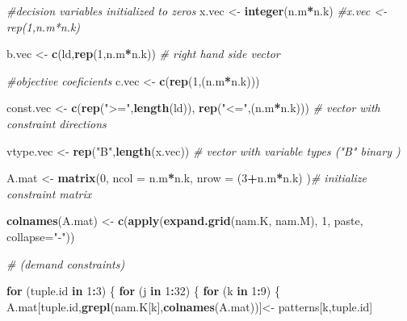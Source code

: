 \documentclass[
]{article}
\newenvironment{Shaded}{\begin{snugshade}}{\end{snugshade}}
\newcommand{\CommentTok}[1]{\textcolor[rgb]{0.56,0.35,0.01}{\textit{#1}}}
\newcommand{\ControlFlowTok}[1]{\textcolor[rgb]{0.13,0.29,0.53}{\textbf{#1}}}
\newcommand{\DataTypeTok}[1]{\textcolor[rgb]{0.13,0.29,0.53}{#1}}
\newcommand{\DecValTok}[1]{\textcolor[rgb]{0.00,0.00,0.81}{#1}}
\newcommand{\KeywordTok}[1]{\textcolor[rgb]{0.13,0.29,0.53}{\textbf{#1}}}
\newcommand{\NormalTok}[1]{#1}
\newcommand{\OperatorTok}[1]{\textcolor[rgb]{0.81,0.36,0.00}{\textbf{#1}}}
\newcommand{\StringTok}[1]{\textcolor[rgb]{0.31,0.60,0.02}{#1}}
\begin{document}
\begin{Shaded}
\begin{Highlighting}[]
\CommentTok{#decision variables initialized to zeros}
\NormalTok{x.vec <-}\StringTok{ }\KeywordTok{integer}\NormalTok{(n.m}\OperatorTok{*}\NormalTok{n.k)}
\CommentTok{#x.vec <- rep(1,n.m*n.k)}

\NormalTok{b.vec <-}\StringTok{ }\KeywordTok{c}\NormalTok{(ld,}\KeywordTok{rep}\NormalTok{(}\DecValTok{1}\NormalTok{,n.m}\OperatorTok{*}\NormalTok{n.k)) }\CommentTok{# right hand side vector }

\CommentTok{#objective coeficients}
\NormalTok{c.vec <-}\StringTok{ }\KeywordTok{c}\NormalTok{(}\KeywordTok{rep}\NormalTok{(}\DecValTok{1}\NormalTok{,(n.m}\OperatorTok{*}\NormalTok{n.k)))}
  
\NormalTok{const.vec <-}\StringTok{ }\KeywordTok{c}\NormalTok{(}\KeywordTok{rep}\NormalTok{(}\StringTok{">="}\NormalTok{,}\KeywordTok{length}\NormalTok{(ld)), }\KeywordTok{rep}\NormalTok{(}\StringTok{"<="}\NormalTok{,(n.m}\OperatorTok{*}\NormalTok{n.k))) }\CommentTok{# vector with constraint directions }

\NormalTok{vtype.vec <-}\StringTok{ }\KeywordTok{rep}\NormalTok{(}\StringTok{"B"}\NormalTok{,}\KeywordTok{length}\NormalTok{(x.vec)) }\CommentTok{# vector with variable types ("B" binary ) }


\NormalTok{A.mat <-}\StringTok{ }\KeywordTok{matrix}\NormalTok{(}\DecValTok{0}\NormalTok{, }\DataTypeTok{ncol =}\NormalTok{ n.m}\OperatorTok{*}\NormalTok{n.k, }\DataTypeTok{nrow =}\NormalTok{ (}\DecValTok{3}\OperatorTok{+}\NormalTok{n.m}\OperatorTok{*}\NormalTok{n.k) )}\CommentTok{# initialize constraint matrix}

\KeywordTok{colnames}\NormalTok{(A.mat) <-}\StringTok{ }\KeywordTok{c}\NormalTok{(}\KeywordTok{apply}\NormalTok{(}\KeywordTok{expand.grid}\NormalTok{(nam.K, nam.M), }\DecValTok{1}\NormalTok{, paste, }\DataTypeTok{collapse=}\StringTok{"-"}\NormalTok{))}

\CommentTok{# (demand constraints)}


\ControlFlowTok{for}\NormalTok{ (tuple.id }\ControlFlowTok{in} \DecValTok{1}\OperatorTok{:}\DecValTok{3}\NormalTok{) \{}
  \ControlFlowTok{for}\NormalTok{ (j }\ControlFlowTok{in} \DecValTok{1}\OperatorTok{:}\DecValTok{32}\NormalTok{) \{}
    \ControlFlowTok{for}\NormalTok{ (k }\ControlFlowTok{in} \DecValTok{1}\OperatorTok{:}\DecValTok{9}\NormalTok{) \{}
\NormalTok{      A.mat[tuple.id,}\KeywordTok{grepl}\NormalTok{(nam.K[k],}\KeywordTok{colnames}\NormalTok{(A.mat))]<-}\StringTok{ }\NormalTok{patterns[k,tuple.id]}
      

\end{Highlighting}
\end{Shaded}
\end{document}
